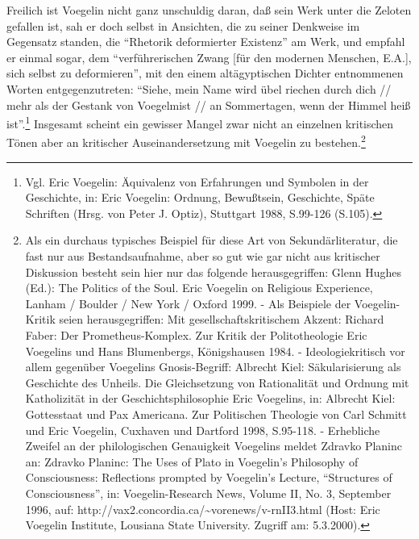 Freilich ist Voegelin nicht ganz unschuldig daran, daß sein Werk unter die
Zeloten gefallen ist, sah er doch selbst in Ansichten, die zu seiner Denkweise
im Gegensatz standen, die "`Rhetorik deformierter Existenz"' am Werk, und
empfahl er einmal sogar, dem "`verführerischen Zwang [für den modernen
Menschen, E.A.], sich selbst zu deformieren"', mit den einem altägyptischen
Dichter entnommenen Worten entgegenzutreten: "`Siehe, mein Name wird übel
riechen durch dich // mehr als der Gestank von Voegelmist // an Sommertagen,
wenn der Himmel heiß ist"'.\footnote{Vgl. Eric Voegelin: Äquivalenz von
  Erfahrungen und Symbolen in der Geschichte, in: Eric Voegelin: Ordnung,
  Bewußtsein, Geschichte, Späte Schriften (Hrsg. von Peter J. Optiz),
  Stuttgart 1988, S.99-126 (S.105).} Insgesamt scheint ein gewisser Mangel
zwar nicht an einzelnen kritischen Tönen aber an kritischer Auseinandersetzung
mit Voegelin zu bestehen.\footnote{Als ein durchaus typisches Beispiel für
  diese Art von Sekundärliteratur, die fast nur aus Bestandsaufnahme, aber so
  gut wie gar nicht aus kritischer Diskussion besteht sein hier nur das
  folgende herausgegriffen: Glenn Hughes (Ed.): The Politics of the Soul. Eric
  Voegelin on Religious Experience, Lanham / Boulder / New York / Oxford 1999.
  - Als Beispiele der Voegelin-Kritik seien herausgegriffen: Mit
  gesellschaftskritischem Akzent: Richard Faber: Der Prometheus-Komplex.  Zur
  Kritik der Politotheologie Eric Voegelins und Hans Blumenbergs, Königshausen
  1984. - Ideologiekritisch vor allem gegenüber Voegelins Gnosis-Begriff:
  Albrecht Kiel: Säkularisierung als Geschichte des Unheils.  Die
  Gleichsetzung von Rationalität und Ordnung mit Katholizität in der
  Geschichtsphilosophie Eric Voegelins, in: Albrecht Kiel: Gottesstaat und Pax
  Americana. Zur Politischen Theologie von Carl Schmitt und Eric Voegelin,
  Cuxhaven und Dartford 1998, S.95-118. - Erhebliche Zweifel an der
  philologischen Genauigkeit Voegelins meldet Zdravko Planinc an: Zdravko
  Planinc: The Uses of Plato in Voegelin's Philosophy of Consciousness:
  Reflections prompted by Voegelin's Lecture, "`Structures of Consciousness"',
  in: Voegelin-Research News, Volume II, No.  3, September 1996, auf:
  http://vax2.concordia.ca/\~{ }vorenews/v-rnII3.html (Host: Eric Voegelin
  Institute, Lousiana State University. Zugriff am: 5.3.2000).}

